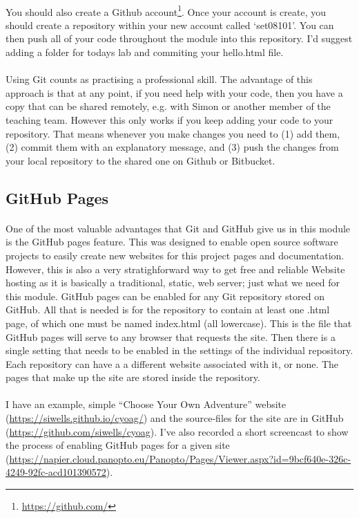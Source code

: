 \documentclass[10pt, a4paper]{article}
\begin{document}
\paragraph{} You should also create a Github account\footnote{\url{https://github.com/}}. Once your account is create, you should create a repository within your new account called `set08101'. You can then push all of your code throughout the module into this repository. I'd suggest adding a folder for todays lab and commiting your hello.html file. 

\paragraph{} Using Git counts as practising a professional skill. The advantage of this approach is that at any point, if you need help with your code, then you have a copy that can be shared remotely, e.g. with Simon or another member of the teaching team. However this only works if you keep adding your code to your repository. That means whenever you make changes you need to (1) add them, (2) commit them with an explanatory message,  and (3) push the changes from your local repository to the shared one on Github or Bitbucket.


\subsection{GitHub Pages}
\paragraph{} One of the most valuable advantages that Git and GitHub give us in this module is the GitHub pages feature. This was designed to enable open source software projects to easily create new websites for this project pages and documentation. However, this is also a very stratighforward way to get free and reliable Website hosting as it is basically a traditional, static, web server; just what we need for this module. GitHub pages can be enabled for any Git repository stored on GitHub. All that is needed is for the repository to contain at least one .html page, of which one must be named index.html (all lowercase). This is the file that GitHub pages will serve to any browser that requests the site. Then there is a single setting that needs to be enabled in the settings of the individual repository. Each repository can have a a different website associated with it, or none. The pages that make up the site are stored inside the repository.

\paragraph{} I have an example, simple ``Choose Your Own Adventure'' website (\url{https://siwells.github.io/cyoag/}) and the source-files for the site are in GitHub (\url{https://github.com/siwells/cyoag}). I've also recorded a short screencast to show the process of enabling GitHub pages for a given site (\url{https://napier.cloud.panopto.eu/Panopto/Pages/Viewer.aspx?id=9bcf640e-326c-4249-92fc-acd101390572}).






\end{document}
